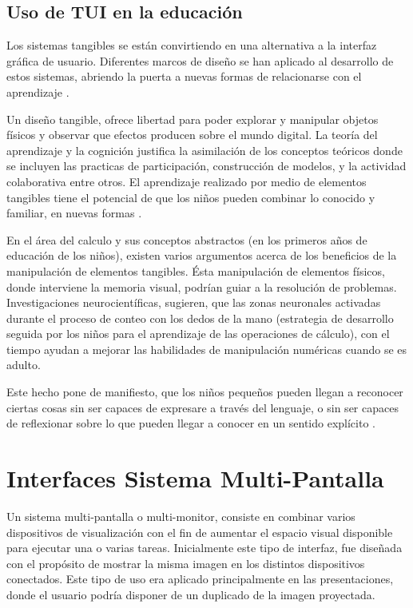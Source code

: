 \subsection{Uso de TUI en la educación}

Los sistemas tangibles se están convirtiendo en una alternativa a la interfaz gráfica de usuario. Diferentes marcos de diseño se han aplicado al desarrollo de estos sistemas, abriendo la puerta a nuevas formas de relacionarse con el aprendizaje \cite{Marshall}.

Un diseño tangible, ofrece libertad para poder explorar y manipular objetos físicos y observar que efectos producen sobre el mundo digital. La teoría del aprendizaje y la cognición justifica la asimilación de los conceptos teóricos donde se incluyen las practicas de participación, construcción de modelos, y la actividad colaborativa entre otros. El aprendizaje realizado por medio de elementos tangibles tiene el potencial de que los niños pueden combinar lo conocido y familiar, en nuevas formas \cite{Manches}.

En el área del calculo y sus conceptos abstractos (en los primeros años de educación de los niños), existen varios argumentos acerca de los beneficios de la manipulación de elementos tangibles. Ésta manipulación de elementos físicos, donde interviene la memoria visual, podrían guiar a la resolución de problemas. Investigaciones neurocientíficas, sugieren, que las zonas neuronales activadas durante el proceso de conteo con los dedos de la mano (estrategia de desarrollo seguida por los niños para el aprendizaje de las operaciones de cálculo), con el tiempo ayudan a mejorar las habilidades de manipulación numéricas cuando se es adulto. 

Este hecho pone de manifiesto, que los niños pequeños pueden llegan a reconocer ciertas cosas sin ser capaces de expresare a través del lenguaje, o sin ser capaces de reflexionar sobre lo que pueden llegar a conocer en un sentido explícito \cite{Malley}.


\section{Interfaces Sistema Multi-Pantalla}
Un sistema multi-pantalla o multi-monitor, consiste en combinar varios dispositivos de visualización con el fin de aumentar el espacio visual disponible para ejecutar una o varias tareas.
Inicialmente este tipo de interfaz, fue diseñada con el propósito de mostrar la misma imagen en los distintos dispositivos conectados. Este tipo de uso era aplicado principalmente en las presentaciones, donde el usuario podría disponer de un duplicado de la imagen proyectada.


